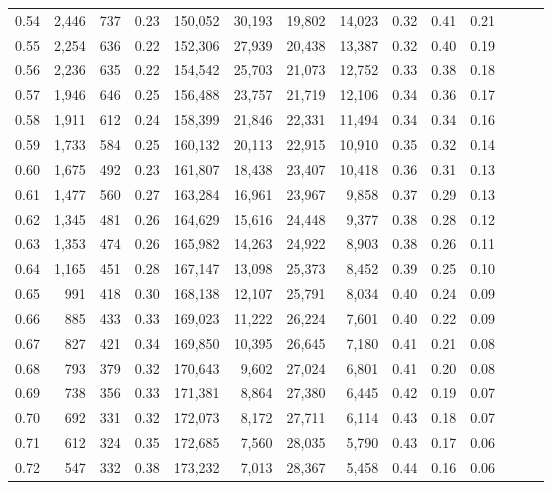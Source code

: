 \begin{tabular}{rrrrrrrrrrrrrr}
0.54 &  2,446 &  737 &  0.23 &  150,052 &   30,193 &  19,802 &  14,023 &  0.32 &  0.41 &      0.21 \\
0.55 &  2,254 &  636 &  0.22 &  152,306 &   27,939 &  20,438 &  13,387 &  0.32 &  0.40 &      0.19 \\
0.56 &  2,236 &  635 &  0.22 &  154,542 &   25,703 &  21,073 &  12,752 &  0.33 &  0.38 &      0.18 \\
0.57 &  1,946 &  646 &  0.25 &  156,488 &   23,757 &  21,719 &  12,106 &  0.34 &  0.36 &      0.17 \\
0.58 &  1,911 &  612 &  0.24 &  158,399 &   21,846 &  22,331 &  11,494 &  0.34 &  0.34 &      0.16 \\
0.59 &  1,733 &  584 &  0.25 &  160,132 &   20,113 &  22,915 &  10,910 &  0.35 &  0.32 &      0.14 \\
0.60 &  1,675 &  492 &  0.23 &  161,807 &   18,438 &  23,407 &  10,418 &  0.36 &  0.31 &      0.13 \\
0.61 &  1,477 &  560 &  0.27 &  163,284 &   16,961 &  23,967 &   9,858 &  0.37 &  0.29 &      0.13 \\
0.62 &  1,345 &  481 &  0.26 &  164,629 &   15,616 &  24,448 &   9,377 &  0.38 &  0.28 &      0.12 \\
0.63 &  1,353 &  474 &  0.26 &  165,982 &   14,263 &  24,922 &   8,903 &  0.38 &  0.26 &      0.11 \\
0.64 &  1,165 &  451 &  0.28 &  167,147 &   13,098 &  25,373 &   8,452 &  0.39 &  0.25 &      0.10 \\
0.65 &    991 &  418 &  0.30 &  168,138 &   12,107 &  25,791 &   8,034 &  0.40 &  0.24 &      0.09 \\
0.66 &    885 &  433 &  0.33 &  169,023 &   11,222 &  26,224 &   7,601 &  0.40 &  0.22 &      0.09 \\
0.67 &    827 &  421 &  0.34 &  169,850 &   10,395 &  26,645 &   7,180 &  0.41 &  0.21 &      0.08 \\
0.68 &    793 &  379 &  0.32 &  170,643 &    9,602 &  27,024 &   6,801 &  0.41 &  0.20 &      0.08 \\
0.69 &    738 &  356 &  0.33 &  171,381 &    8,864 &  27,380 &   6,445 &  0.42 &  0.19 &      0.07 \\
0.70 &    692 &  331 &  0.32 &  172,073 &    8,172 &  27,711 &   6,114 &  0.43 &  0.18 &      0.07 \\
0.71 &    612 &  324 &  0.35 &  172,685 &    7,560 &  28,035 &   5,790 &  0.43 &  0.17 &      0.06 \\
0.72 &    547 &  332 &  0.38 &  173,232 &    7,013 &  28,367 &   5,458 &  0.44 &  0.16 &      0.06 \\

\end{tabular}
